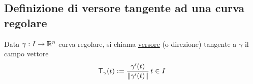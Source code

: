\subsection{Definizione di versore tangente ad una curva regolare}
\begin{definition}
  Data $\gamma : I \to \mathbb{R}^n$ curva regolare, si chiama \underline{versore} (o direzione) tangente a $\gamma$
  il campo vettore $$\mathsf{T}_{\gamma} (t) := \frac{\gamma'(t)}{\left\lVert\gamma'(t)\right\rVert} \, t \in I$$
\end{definition}
